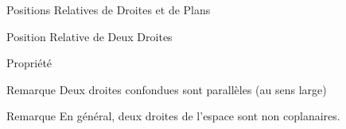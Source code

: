 \documentclass{cours}
\begin{document}
\begin{Gpartie}{Positions Relatives de Droites et de Plans}
\begin{Spartie}{Position Relative de Deux Droites}
\begin{SSpartie}{Propriété}
\begin{center}
                    \parbox{\linewidth}{}
                \end{center}
            \end{SSpartie}
            \begin{SSpartie}{Remarque} 
                Deux droites confondues sont parallèles (au sens large)
            \end{SSpartie}
            \begin{SSpartie}{Remarque} 
                En général, deux droites de l'espace sont non coplanaires.
            \end{SSpartie}
        \end{Spartie}
    \end{Gpartie}
\end{document}
